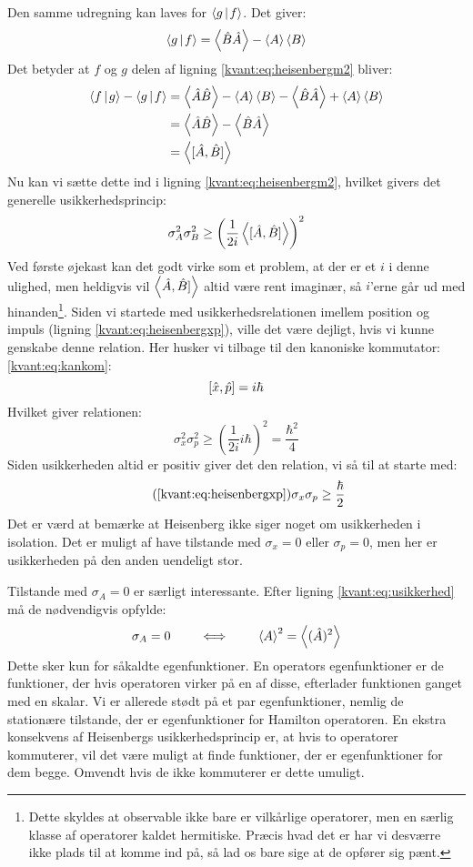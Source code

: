 \documentclass[../Kvantemekanik.tex]{subfiles}
\begin{document}
Den samme udregning kan laves for $\braket{g}{f}$. Det giver:
$$
\braket{g}{f} = \expect{\op B\op A}-\expect A \expect B
$$
Det betyder at $f$ og $g$ delen af ligning \eqref{kvant:eq:heisenbergm2} bliver:
\begin{align*}
\braket{f}{g}-\braket{g}{f} &= \expect{\op A \op B}-\expect A\expect B-\expect{\op B \op A} + \expect A \expect B\\
&= \expect{\op A \op B}-\expect{\op B \op A}\\
&= \expect{[\op A,\op B]}
\end{align*}
Nu kan vi sætte dette ind i ligning \eqref{kvant:eq:heisenbergm2}, hvilket givers det generelle usikkerhedsprincip:
\begin{equation}
    \sigma_A^2\sigma_B^2\geq \left(\frac{1}{2i}\left< [\hat A,\hat B] \right>\right)^2
    \label{kvant:eq:heisenberg}
\end{equation}
Ved første øjekast kan det godt virke som et problem, at der er et $i$ i denne ulighed, men heldigvis vil $\left< \hat A,\hat B] \right>$ altid være rent imaginær, så $i$'erne går ud med hinanden\footnote{
Dette skyldes at observable ikke bare er vilkårlige operatorer, men en særlig klasse af operatorer kaldet hermitiske. Præcis hvad det er har vi desværre ikke plads til at komme ind på, så lad os bare sige at de opfører sig pænt.}.
Siden vi startede med usikkerhedsrelationen imellem position og impuls (ligning \eqref{kvant:eq:heisenbergxp}), ville det være dejligt, hvis vi kunne genskabe denne relation. Her husker vi tilbage til den kanoniske kommutator: \eqref{kvant:eq:kankom}:
$$
[\hat x,\hat p] = i\hbar
$$
Hvilket giver relationen:
\begin{equation}
\sigma_x^2\sigma_p^2 \geq \left( \frac{1}{2i}i\hbar \right)^2 = \frac{\hbar^2}{4}
\end{equation}
Siden usikkerheden altid er positiv giver det den relation, vi så til at starte med:
\begin{equation}\tag{\ref{kvant:eq:heisenbergxp}}
\sigma_x\sigma_p \geq \frac{\hbar}{2}
\end{equation}
Det er værd at bemærke at Heisenberg ikke siger noget om usikkerheden i isolation. Det er muligt af have tilstande med $\sigma_x =0$ eller $\sigma_p=0$, men her er usikkerheden på den anden uendeligt stor.

Tilstande med $\sigma_A=0$ er særligt interessante. Efter ligning \eqref{kvant:eq:usikkerhed} må de nødvendigvis opfylde:
\begin{equation}
    \sigma_A=0 ~~~~~~\iff ~~~~~~\left< A \right>^2=\left< (\hat A)^2 \right>
\end{equation}
Dette sker kun for såkaldte egenfunktioner. En operators egenfunktioner er de funktioner, der hvis operatoren virker på en af disse, efterlader funktionen ganget med en skalar. Vi er allerede stødt på et par egenfunktioner, nemlig de stationære tilstande, der er egenfunktioner for Hamilton operatoren. En ekstra konsekvens af Heisenbergs usikkerhedsprincip er, at hvis to operatorer kommuterer, vil det være muligt at finde funktioner, der er egenfunktioner for dem begge. Omvendt hvis de ikke kommuterer er dette umuligt.
\end{document}

